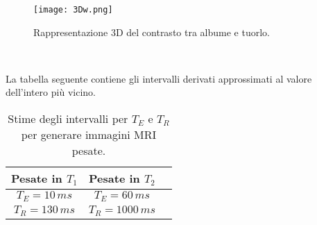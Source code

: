 \begin{figure}[ht]
\centering
\texttt{[image: 3Dw.png]}
\caption{Rappresentazione 3D del contrasto tra albume e tuorlo.}
\label{fig:3D}
\end{figure}

\begin{figure}[ht]
\centering
{} \quad
{} \\
\caption{}
\label{fig:Contrasto}
\end{figure}


La tabella seguente contiene gli intervalli derivati approssimati al valore dell'intero più vicino.


\begin{table}[ht]
	\centering
	\begin{tabular}{ccc}
	\toprule
		\textbf{Pesate in $T_1$} &	\textbf{Pesate in $T_2$}	\\
	\midrule
		$T_E = 10\,ms$			&		$T_E = 60\,ms$	 \\	
		$T_R = 130\,ms$			&		$T_R = 1000\,ms$ \\
	\bottomrule
	\end{tabular}
	\caption{Stime degli intervalli per $T_E$ e $T_R$ per generare immagini MRI pesate.}	
	\label{tab:Pesate}
\end{table}